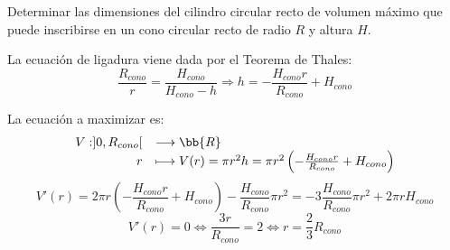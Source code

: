 \begin{ejercicio}
    Determinar las dimensiones del cilindro circular recto de volumen máximo que puede inscribirse en un cono circular recto de radio $R$ y altura $H$.
    \begin{figure}[H]
        \centering
    \end{figure}
    La ecuación de ligadura viene dada por el Teorema de Thales:
    \begin{equation*}
        \frac{R_{cono}}{r} = \frac{H_{cono}}{H_{cono} - h} \Longrightarrow h=- \frac{H_{cono}r}{R_{cono}} + H_{cono}
    \end{equation*}

    La ecuación a maximizar es:
    \begin{equation*}
        \begin{array}{rl}
            V:]0, R_{cono}[ & \longrightarrow \bb{R}\\
                    r & \longmapsto V(r)= \pi r^2 h = \pi r^2\left(- \frac{H_{cono}r}{R_{cono}} + H_{cono}\right)
        \end{array}
    \end{equation*}
    \begin{equation*}
        V'(r) = 2\pi r\left(- \frac{H_{cono}r}{R_{cono}} + H_{cono}\right) -\frac{H_{cono}}{R_{cono}}\pi r^2 = -3\frac{H_{cono}}{R_{cono}}\pi r^2 + 2\pi r H_{cono}
    \end{equation*}
    \begin{equation*}
        V'(r)=0 \Longleftrightarrow \frac{3r}{R_{cono}} = 2 \Longleftrightarrow r=\frac{2}{3}R_{cono}
    \end{equation*}


\end{ejercicio}
